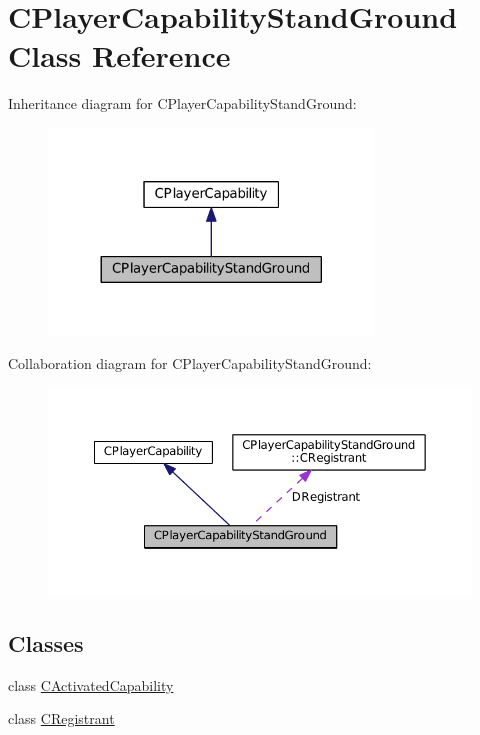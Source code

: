 \hypertarget{classCPlayerCapabilityStandGround}{}\section{C\+Player\+Capability\+Stand\+Ground Class Reference}
\label{classCPlayerCapabilityStandGround}


Inheritance diagram for C\+Player\+Capability\+Stand\+Ground\+:\nopagebreak
\begin{figure}[H]
\begin{center}
\leavevmode
\includegraphics[width=245pt]{classCPlayerCapabilityStandGround__inherit__graph}
\end{center}
\end{figure}


Collaboration diagram for C\+Player\+Capability\+Stand\+Ground\+:\nopagebreak
\begin{figure}[H]
\begin{center}
\leavevmode
\includegraphics[width=350pt]{classCPlayerCapabilityStandGround__coll__graph}
\end{center}
\end{figure}
\subsection*{Classes}
\begin{DoxyCompactItemize}
\item 
class \hyperlink{classCPlayerCapabilityStandGround_1_1CActivatedCapability}{C\+Activated\+Capability}
\item 
class \hyperlink{classCPlayerCapabilityStandGround_1_1CRegistrant}{C\+Registrant}
\end{DoxyCompactItemize}
